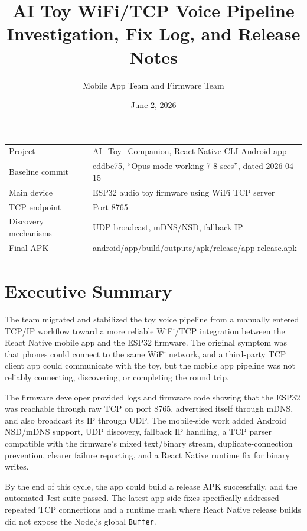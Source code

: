 \documentclass[11pt,a4paper]{article}
\title{
  AI Toy WiFi/TCP Voice Pipeline\\
  Investigation, Fix Log, and Release Notes
}
\author{Mobile App Team and Firmware Team}
\date{June 2, 2026}
\begin{document}
\maketitle

\begin{center}
\begin{tabular}{ll}
\toprule
Project & AI\_Toy\_Companion, React Native CLI Android app \\
Baseline commit & eddbe75, ``Opus mode working 7-8 secs'', dated 2026-04-15 \\
Main device & ESP32 audio toy firmware using WiFi TCP server \\
TCP endpoint & Port 8765 \\
Discovery mechanisms & UDP broadcast, mDNS/NSD, fallback IP \\
Final APK & android/app/build/outputs/apk/release/app-release.apk \\
\bottomrule
\end{tabular}
\end{center}

\section{Executive Summary}

The team migrated and stabilized the toy voice pipeline from a manually entered TCP/IP workflow toward a more reliable WiFi/TCP integration between the React Native mobile app and the ESP32 firmware. The original symptom was that phones could connect to the same WiFi network, and a third-party TCP client app could communicate with the toy, but the mobile app pipeline was not reliably connecting, discovering, or completing the round trip.

The firmware developer provided logs and firmware code showing that the ESP32 was reachable through raw TCP on port 8765, advertised itself through mDNS, and also broadcast its IP through UDP. The mobile-side work added Android NSD/mDNS support, UDP discovery, fallback IP handling, a TCP parser compatible with the firmware's mixed text/binary stream, duplicate-connection prevention, clearer failure reporting, and a React Native runtime fix for binary writes.

By the end of this cycle, the app could build a release APK successfully, and the automated Jest suite passed. The latest app-side fixes specifically addressed repeated TCP connections and a runtime crash where React Native release builds did not expose the Node.js global \texttt{Buffer}.
\end{document}
